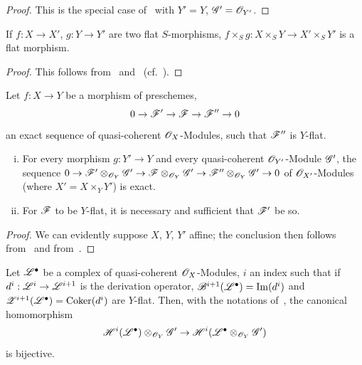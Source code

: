 \begin{proof}
This is the special case of~ with $Y'=Y$, $\mathscr{G}'=\mathscr{O}_{Y'}$.
\end{proof}

\begin{corollary}[2.1.7]
\label{IV.2.1.7}
If $f:X\to X'$, $g:Y\to Y'$ are two flat $S$-morphisms, $f\times_S g:X\times_S Y\to X'\times_S Y'$ is a flat morphism.
\end{corollary}

\begin{proof}
This follows from~ and~ (cf.~).
\end{proof}

\begin{proposition}[2.1.8]
\label{IV.2.1.8}
Let $f:X\to Y$ be a morphism of preschemes,
\[
  0 \to \mathscr{F}' \to \mathscr{F} \to \mathscr{F}'' \to 0
\]
an exact sequence of quasi-coherent $\mathscr{O}_X$-Modules, such that $\mathscr{F}''$ is $Y$-flat.
\begin{enumerate}[(i)]
  \item For every morphism $g:Y'\to Y$ and every quasi-coherent $\mathscr{O}_{Y'}$-Module $\mathscr{G}'$, the sequence
    $0\to\mathscr{F}'\otimes_{\mathscr{O}_Y}\mathscr{G}'\to\mathscr{F}\otimes_{\mathscr{O}_Y}\mathscr{G}'\to\mathscr{F}''\otimes_{\mathscr{O}_Y}\mathscr{G}'\to 0$ of $\mathscr{O}_{X'}$-Modules \textnormal{(}where $X'=X\times_Y Y'$\textnormal{)} is exact.
  \item For $\mathscr{F}$ to be $Y$-flat, it is necessary and sufficient that $\mathscr{F}'$ be so.
\end{enumerate}
\end{proposition}

\begin{proof}
We can evidently suppose $X$, $Y$, $Y'$ affine; the conclusion then follows from~ and from~.
\end{proof}

\begin{corollary}[2.1.9]
\label{IV.2.1.9}
Let $\mathscr{L}^\bullet$ be a complex of quasi-coherent $\mathscr{O}_X$-Modules, $i$ an index such that if $d^i:\mathscr{L}^i\to\mathscr{L}^{i+1}$ is the derivation operator, $\mathscr{B}^{i+1}(\mathscr{L}^\bullet)=\operatorname{Im}(d^i)$ and $\mathscr{Z}^{i+1}(\mathscr{L}^\bullet)=\operatorname{Coker}(d^i)$ are $Y$-flat.
Then, with the notations of~, the canonical homomorphism
\[
  \mathscr{H}^i(\mathscr{L}^\bullet)\otimes_{\mathscr{O}_Y}\mathscr{G}' \to \mathscr{H}^i(\mathscr{L}^\bullet\otimes_{\mathscr{O}_Y}\mathscr{G}')
\]
is bijective.
\end{corollary}

